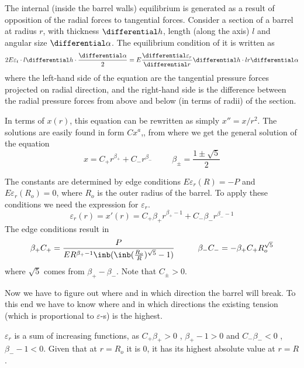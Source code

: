 The internal (inside the barrel walls) equilibrium is generated
as a result of opposition of the radial forces to tangential forces.
Consider a section of a barrel at radius $r$,
with thickness $\differential h$, length (along the axis) $l$
and angular size $\differential \alpha$.
The equilibrium condition of it is written as
\begin{equation}
    2 E \varepsilon_t \cdot l \differential h \cdot \frac{\differential \alpha}{2} =
    E \frac{\differential \varepsilon_r}{\differential r} \differential h \cdot l r \differential \alpha
\end{equation}
where the left-hand side of the equation are the tangential pressure forces
projected on radial direction,
and the right-hand side is the difference between the radial pressure forces
from above and below (in terms of radii) of the section.

In terms of $x(r)$, this equation can be rewritten as simply $x''=x/r^2$.
The solutions are easily found in form $Cx^a$,,
from where we get the general solution of the equation
\begin{equation}
    x = C_+ r^{\beta_+} + C_- r^{\beta_-}
    \hspace{1cm}
    \beta_\pm = \frac{1 \pm \sqrt{5}}{2}
\end{equation}

The constants are determined by edge conditions
$E \varepsilon_r(R) = -P$ and $E \varepsilon_r(R_o) = 0$,
where $R_o$ is the outer radius of the barrel.
To apply these conditions we need the expression for $\varepsilon_r$.
\begin{equation}
    \varepsilon_r(r) = x'(r) = 
    C_+ \beta_+ r^{\beta_+ - 1} +
    C_- \beta_- r^{\beta_- - 1}
\end{equation}
The edge conditions result in
\begin{equation}
    \beta_+ C_+ = \frac{P}{E R^{\beta_+ - 1}
    \inb({ \inb({\frac{R_o}{R}})^{\sqrt{5}} - 1}) } 
    \hspace{1cm} \beta_- C_- = -\beta_+ C_+ R_o^{\sqrt{5}}
\end{equation}
where $\sqrt{5}$ comes from $\beta_+ - \beta_-$.
Note that $C_{\pm} > 0$.

Now we have to figure out where and in which direction
the barrel will break.
To this end we have to know where and in which directions
the existing tension (which is proportional to $\varepsilon$-s) is the highest.

$\varepsilon_r$ is a sum of increasing functions,
as $C_+ \beta_+ > 0$ , $\beta_+ - 1 > 0$ and
$C_- \beta_- < 0$ , $\beta_- - 1 < 0$.
Given that at $r = R_o$ it is $0$,
it has its highest absolute value at $r = R$.

